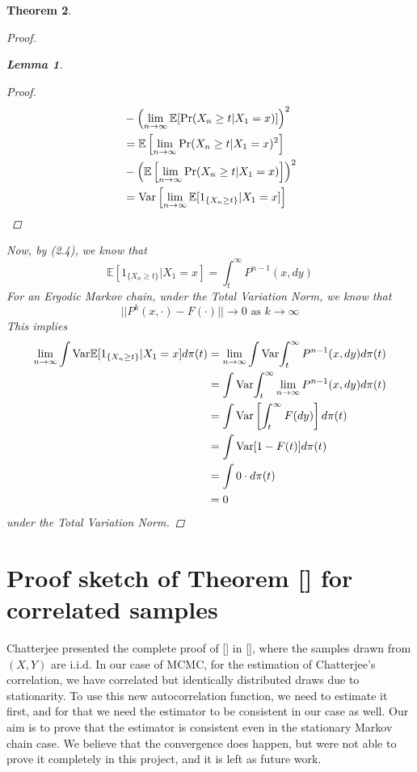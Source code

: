\documentclass{article}
\newtheorem{theorem}{Theorem}[section]
\newtheorem{lemma}[theorem]{Lemma}
\begin{document}
\begin{theorem}
\begin{proof}
\begin{lemma}
\begin{proof}
\begin{align*}
						&- \left(\lim_{n \rightarrow \infty} \mathbb{E}[\Pr(X_{n} \geq t | X_{1} = x)]\right)^2\\
						&= \mathbb{E}\left[\lim_{n \rightarrow \infty} \Pr(X_{n} \geq t | X_{1} = x)^2\right]\\
						&- \left(\mathbb{E}\left[\lim_{n \rightarrow \infty}\Pr(X_{n} \geq t | X_{1} = x)\right]\right)^2\\
						&= \text{Var}\left[\lim_{n \rightarrow \infty} \mathbb{E}[1_{\{X_{n} \geq t\}}|X_1=x]\right]
					\end{align*}
				\end{proof}
			\end{lemma}
			Now, by (2.4), we know that
			\begin{equation*}
				\mathbb{E}[1_{\{X_{n} \geq t\}}|X_1=x] = \int_t^{\infty} P^{n-1}(x, dy)
			\end{equation*}
			For an Ergodic Markov chain, under the Total Variation Norm, we know that
			\begin{equation*}
				||P^k(x, \cdot) - F(\cdot)|| \rightarrow 0 \text{ as } k \rightarrow \infty
			\end{equation*}
			This implies
			\begin{align*}
				\lim_{n \rightarrow \infty} \int \text{Var}{\mathbb{E}[1_{\{X_{n} \geq t\}}|X_1=x]} d\pi(t) &= \lim_{n \rightarrow \infty} \int \text{Var}{\int_t^{\infty} P^{n-1}(x, dy)} d\pi(t)\\
				&= \int \text{Var}{\int_t^{\infty} \lim_{n \rightarrow \infty} P^{n-1}(x, dy)} d\pi(t)\\
				&= \int \text{Var}\left[\int_t^{\infty} F(dy)\right] d\pi(t)\\
				&= \int \text{Var}[1-F(t)] d\pi(t)\\
				&= \int 0 \cdot d\pi(t)\\
				&= 0
			\end{align*}
			under the Total Variation Norm.
		\end{proof}
	\end{theorem}

\section{Proof sketch of Theorem [] for correlated samples}
	Chatterjee presented the complete proof of [] in [], where the samples drawn from $(X, Y)$ are i.i.d.
	In our case of MCMC, for the estimation of Chatterjee's correlation, we have correlated but identically distributed draws due to stationarity.
	To use this new autocorrelation function, we need to estimate it first, and for that we need the estimator to be consistent in our case as well.
	Our aim is to prove that the estimator is consistent even in the stationary Markov chain case.
	We believe that the convergence does happen, but were not able to prove it completely in this project, and it is left as future work.
\end{document}
